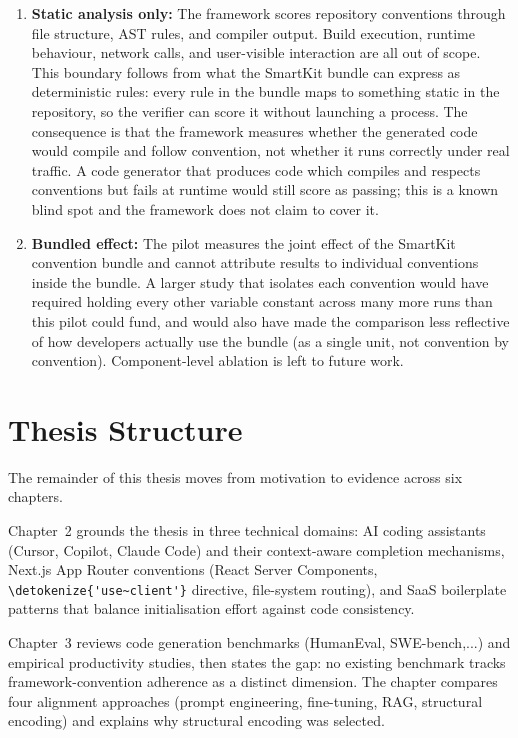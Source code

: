 \documentclass[12pt,a4paper]{report}
\newcommand{\code}[1]{\texttt{\nolinkurl{\detokenize{#1}}}}
\newcommand{\usec}{\code{'use~client'}}
\begin{document}
\begin{enumerate}
    \item \textbf{Static analysis only:}
    The framework scores repository conventions through file
    structure, AST rules, and compiler output. Build execution,
    runtime behaviour, network calls, and user-visible interaction
    are all out of scope. This boundary follows from what the
    SmartKit bundle can express as deterministic rules: every rule
    in the bundle maps to something static in the repository, so the
    verifier can score it without launching a process. The
    consequence is that the framework measures whether the generated
    code would compile and follow convention, not whether it runs
    correctly under real traffic. A code generator that produces
    code which compiles and respects conventions but fails at
    runtime would still score as passing; this is a known blind spot
    and the framework does not claim to cover it.

    \item \textbf{Bundled effect:}
    The pilot measures the joint effect of the SmartKit convention
    bundle and cannot attribute results to individual conventions
    inside the bundle. A larger study that isolates each convention
    would have required holding every other variable constant
    across many more runs than this pilot could fund, and would
    also have made the comparison less reflective of how developers
    actually use the bundle (as a single unit, not convention by
    convention). Component-level ablation is left to future work.
\end{enumerate}

\section{Thesis Structure}
\label{sec:thesis-structure}

The remainder of this thesis moves from motivation to evidence across six chapters.

Chapter~2 grounds the thesis in three technical domains: AI coding assistants (Cursor, Copilot, Claude Code) and their context-aware completion mechanisms, Next.js App Router conventions (React Server Components, \usec{} directive, file-system routing), and SaaS boilerplate patterns that balance initialisation effort against code consistency.

Chapter~3 reviews code generation benchmarks (HumanEval, SWE-bench,...) and empirical productivity studies, then states the gap: no existing benchmark tracks framework-convention adherence as a distinct dimension. The chapter compares four alignment approaches (prompt engineering, fine-tuning, RAG, structural encoding) and explains why structural encoding was selected.
\end{document}
